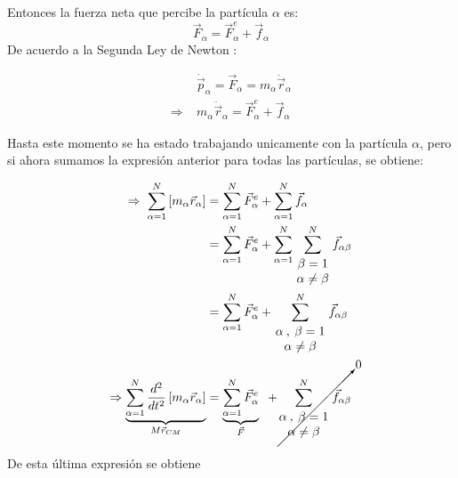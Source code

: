 \documentclass[/home/hernan/Documentos/Apuntes_mecanica_teorica/main.tex]{subfiles}
\begin{document}
		Entonces la fuerza neta que percibe la partícula $\alpha$ es:
		\begin{equation*}
			\vec{F}_{\alpha} = \vec{F}_{\alpha}^{e} + \vec{f}_{\alpha}
		\end{equation*}
		De acuerdo a la Segunda Ley de Newton :

		\begin{align*}
			& \dot{\vec{p}}_{\alpha} = \vec{F}_{\alpha} = m_{\alpha}\ddot{\vec{r}}_{\alpha} \\ 
			\Rightarrow \; & m_{\alpha}\ddot{\vec{r}}_{\alpha} = \vec{F}_{\alpha}^{e} + \vec{f}_{\alpha}
		\end{align*}

		Hasta este momento se ha estado trabajando unicamente con la partícula $\alpha$, pero si ahora sumamos la expresión anterior para todas las partículas, se obtiene:

		\begin{align*}
			\Rightarrow \; \sum_{\alpha  = 1}^{N} \left[m_{\alpha} \vec{r}_{\alpha}\right] & = \sum_{\alpha = 1}^{N} \vec{F}_{\alpha}^{e} + \sum_{\alpha = 1}^{N} \vec{f}_{\alpha} \\ 
			& = \sum_{\alpha = 1}^{N} \vec{F}_{\alpha}^{e} + \sum_{\alpha = 1}^{N} \sum_{\left .\begin{matrix} \beta = 1\\ \alpha \neq \beta \end{matrix}\right .}^{N}\vec{f}_{\alpha \beta} \\ 
			& =  \sum_{\alpha = 1}^{N} \vec{F}_{\alpha}^{e} + \sum_{\left .\begin{matrix} \alpha \: , \: \beta = 1\\ \alpha \neq \beta \end{matrix}\right .}^{N}\vec{f}_{\alpha \beta} \\ 
			\Rightarrow \underbrace{\sum_{\alpha  = 1}^{N} \frac{d^{2}}{dt^{2}} \left[m_{\alpha} \vec{r}_{\alpha}\right]}_{M \vec{r}_{CM}} & = \underbrace{ \sum_{\alpha = 1}^{N} \vec{F}_{\alpha}^{e}}_{\vec{F}} \; \; + \cancelto{0}{\sum_{\left . \begin{matrix} \alpha \: , \: \beta = 1\\ \alpha \neq \beta \end{matrix} \right .}^{N}\vec{f}_{\alpha \beta}}
		\end{align*} 

		De esta última expresión se obtiene 
\end{document}
